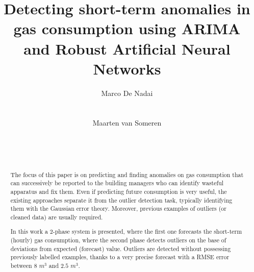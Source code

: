 \documentclass{sig-alternate-sigmod07}
\begin{document}
%
\makeatletter
\def\@copyrightspace{\relax}
\makeatother
\title{Detecting short-term anomalies in gas consumption using ARIMA and Robust Artificial Neural Networks}
%
%
\author{
%
%
\alignauthor
Marco De Nadai\\
       \\
      \\
\alignauthor
Maarten van Someren\\ 
       \\
       \\
       \\
}
\maketitle
\begin{abstract}

The focus of this paper is on predicting and finding anomalies on gas consumption that can successively be reported to the building managers who can identify wasteful apparatus and fix them.  Even if predicting future consumption is very useful, the existing approaches separate it from the outlier detection task, typically identifying them with the Gaussian error theory. Moreover, previous examples of outliers (or cleaned data) are usually required.

In this work a 2-phase system is presented, where the first one forecasts the short-term (hourly) gas consumption, where the second phase detects outliers on the base of deviations from expected (forecast) value. Outliers are detected without possessing previously labelled examples, thanks to a very precise forecast with a RMSE error between $8$ $m^3$ and $2.5$ $m^3$. 

\end{abstract}
\end{document}
